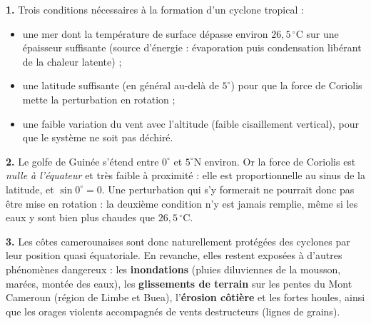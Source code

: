 \documentclass[11pt]{article}
\newcommand{\cle}[1]{{\popxbold\color{popdark}#1}}
\begin{document}
\begin{corrige}
\textbf{1.} Trois conditions nécessaires à la formation d'un cyclone tropical :
\begin{itemize}
\item une mer dont la température de surface dépasse environ $26,5\,^\circ$C sur une épaisseur suffisante (source d'énergie : évaporation puis condensation libérant de la chaleur latente) ;
\item une latitude suffisante (en général au-delà de $5^\circ$) pour que la \cle{force de Coriolis} mette la perturbation en rotation ;
\item une faible variation du vent avec l'altitude (faible cisaillement vertical), pour que le système ne soit pas déchiré.
\end{itemize}

\textbf{2.} Le golfe de Guinée s'étend entre $0^\circ$ et $5^\circ$N environ. Or la force de Coriolis est \emph{nulle à l'équateur} et très faible à proximité : elle est proportionnelle au sinus de la latitude, et $\sin 0^\circ = 0$. Une perturbation qui s'y formerait ne pourrait donc pas être mise en rotation : la deuxième condition n'y est jamais remplie, même si les eaux y sont bien plus chaudes que $26,5\,^\circ$C.

\textbf{3.} Les côtes camerounaises sont donc naturellement protégées des cyclones par leur position quasi équatoriale. En revanche, elles restent exposées à d'autres phénomènes dangereux : les \textbf{inondations} (pluies diluviennes de la mousson, marées, montée des eaux), les \textbf{glissements de terrain} sur les pentes du Mont Cameroun (région de Limbe et Buea), l'\textbf{érosion côtière} et les fortes houles, ainsi que les orages violents accompagnés de vents destructeurs (lignes de grains).
\end{corrige}
\end{document}
